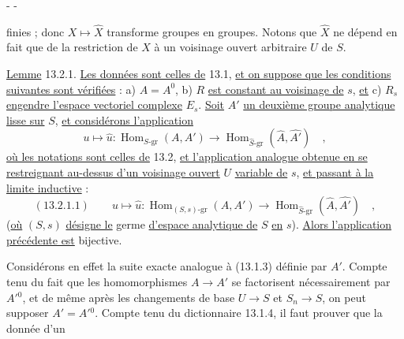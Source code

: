 \begin{center}-  -\end{center}

finies ; donc $X\longmapsto\widehat X$ transforme groupes en groupes. Notons que $\widehat X$ ne dépend en fait que de la restriction de $X$ à un voisinage ouvert arbitraire $U$ de $S$.

\uline{Lemme} 13.2.1. \uline{Les données sont celles de} 13.1, \uline{et on suppose que les conditions suivantes sont vérifiées} : a) $A=A^0$, b) $R$ \uline{est constant au voisinage de} $s$, \uline{et} c) $R_s$ \uline{engendre l'espace vectoriel complexe} $E_s$. \uline{Soit} $A'$ \uline{un deuxième groupe analytique lisse sur} $S$, \uline{et considérons l'application}
\[
u\longmapsto\widehat u:\operatorname{Hom}_{S\text{-}\mathrm{gr}}(A,A')\longrightarrow\operatorname{Hom}_{\widehat S\text{-}\mathrm{gr}}(\widehat A,\widehat {A'})\quad,
\]
\uline{où les notations sont celles de} 13.2, \uline{et l'application analogue obtenue en se restreignant au-dessus d'un voisinage ouvert} $U$ \uline{variable de} $s$, \uline{et passant à la limite inductive} :
\[
(13.2.1.1)\qquad u\longmapsto\widehat u:\operatorname{Hom}_{(S,s)\text{-}\mathrm{gr}}(A,A')\longrightarrow\operatorname{Hom}_{\widehat S\text{-}\mathrm{gr}}(\widehat A,\widehat {A'})\quad,
\]
(\uline{où} $(S,s)$ \uline{désigne le} germe \uline{d'espace analytique de} $S$ \uline{en} $s$). \uline{Alors l'application précédente est} bijective.

Considérons en effet la suite exacte
analogue à (13.1.3) définie par $A'$. Compte tenu du fait que les homomorphismes $A\longrightarrow A'$ se factorisent nécessairement par $A'{}^0$, et de même après les changements de base $U\longrightarrow S$ et $S_n\longrightarrow S$, on peut supposer $A'=A'{}^0$. Compte tenu du dictionnaire 13.1.4, il faut prouver que la donnée d'un



